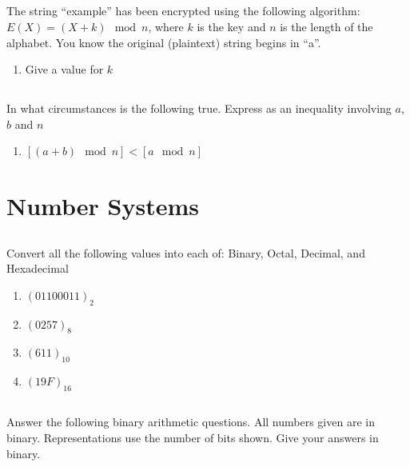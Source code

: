\documentclass[twocolumn]{article}
\begin{document}
\subsection{}

    The string ``example'' has been encrypted using the following algorithm: $E(X) = (X + k) \mod n$, where $k$ is the key and $n$ is the length of the alphabet. You know the original (plaintext) string begins in “a”.

    \begin{enumerate}
        \item Give a value for $k$
    \end{enumerate}

\subsection{}

In what circumstances is the following true. Express as an inequality involving $a$, $b$ and $n$

\begin{enumerate}
    \item $[(a + b) \mod n] < [a \mod n]$
\end{enumerate}


\clearpage
\section{Number Systems}

\subsection{}

    Convert all the following values into each of: Binary, Octal, Decimal, and Hexadecimal

    \begin{enumerate}
        \item $ ( 01100011 )_2 $
        \item $ ( 0257)_8 $
        \item $ ( 611 )_{10} $
        \item $ ( 19F )_{16} $
    \end{enumerate}

\subsection{}

    Answer the following binary arithmetic questions. All numbers given are in binary. Representations use the number of bits shown. Give your answers in binary.
\end{document}
